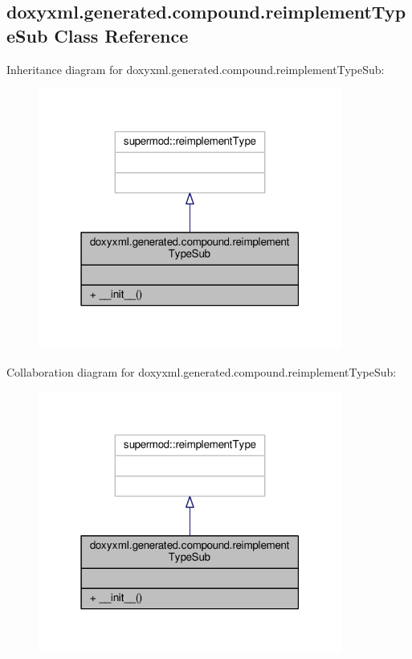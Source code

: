 \subsection{doxyxml.\+generated.\+compound.\+reimplement\+Type\+Sub Class Reference}
\label{classdoxyxml_1_1generated_1_1compound_1_1reimplementTypeSub}


Inheritance diagram for doxyxml.\+generated.\+compound.\+reimplement\+Type\+Sub\+:
\nopagebreak
\begin{figure}[H]
\begin{center}
\leavevmode
\includegraphics[width=283pt]{db/d5a/classdoxyxml_1_1generated_1_1compound_1_1reimplementTypeSub__inherit__graph}
\end{center}
\end{figure}


Collaboration diagram for doxyxml.\+generated.\+compound.\+reimplement\+Type\+Sub\+:
\nopagebreak
\begin{figure}[H]
\begin{center}
\leavevmode
\includegraphics[width=283pt]{d4/d53/classdoxyxml_1_1generated_1_1compound_1_1reimplementTypeSub__coll__graph}
\end{center}
\end{figure}
